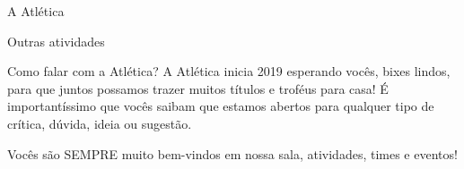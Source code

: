 \begin{secao}{A Atlética}
\begin{subsecao}{Outras atividades}
\begin{subsubsecao}{Como falar com a Atlética?}
A Atlética inicia 2019 esperando vocês, bixes lindos, para que juntos possamos
trazer muitos títulos e troféus para casa! É importantíssimo que vocês saibam
que estamos abertos para qualquer tipo de crítica, dúvida, ideia ou sugestão.

Vocês são SEMPRE muito bem-vindos em nossa sala, atividades, times e eventos!
\end{subsubsecao}
\end{subsecao}
\end{secao}
